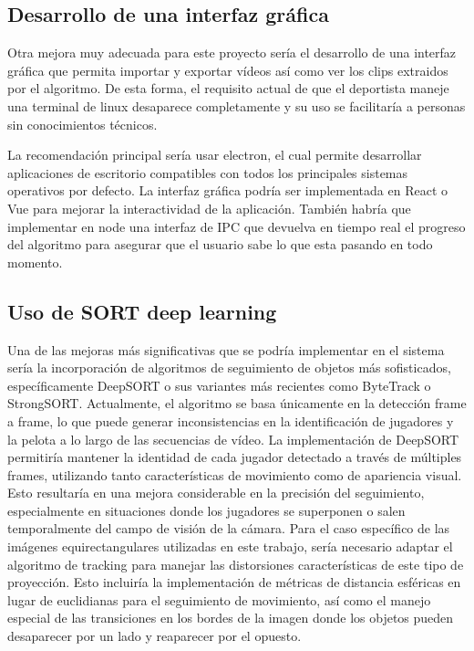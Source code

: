 \subsection{Desarrollo de una interfaz gráfica}
Otra mejora muy adecuada para este proyecto sería el desarrollo de una interfaz gráfica que permita importar y exportar vídeos así como ver los clips extraidos por el algoritmo. De esta forma, el requisito actual de que el deportista maneje una terminal de linux desaparece completamente y su uso se facilitaría a personas sin conocimientos técnicos.

La recomendación principal sería usar electron, el cual permite desarrollar aplicaciones de escritorio compatibles con todos los principales sistemas operativos por defecto. La interfaz gráfica podría ser implementada en React o Vue para mejorar la interactividad de la aplicación. También habría que implementar en node una interfaz de IPC que devuelva en tiempo real el progreso del algoritmo para asegurar que el usuario sabe lo que esta pasando en todo momento.

\subsection{Uso de SORT deep learning}
Una de las mejoras más significativas que se podría implementar en el sistema sería la incorporación de algoritmos de seguimiento de objetos más sofisticados, específicamente DeepSORT o sus variantes más recientes como ByteTrack o StrongSORT. Actualmente, el algoritmo se basa únicamente en la detección frame a frame, lo que puede generar inconsistencias en la identificación de jugadores y la pelota a lo largo de las secuencias de vídeo.
La implementación de DeepSORT permitiría mantener la identidad de cada jugador detectado a través de múltiples frames, utilizando tanto características de movimiento como de apariencia visual. Esto resultaría en una mejora considerable en la precisión del seguimiento, especialmente en situaciones donde los jugadores se superponen o salen temporalmente del campo de visión de la cámara.
Para el caso específico de las imágenes equirectangulares utilizadas en este trabajo, sería necesario adaptar el algoritmo de tracking para manejar las distorsiones características de este tipo de proyección. Esto incluiría la implementación de métricas de distancia esféricas en lugar de euclidianas para el seguimiento de movimiento, así como el manejo especial de las transiciones en los bordes de la imagen donde los objetos pueden desaparecer por un lado y reaparecer por el opuesto.

